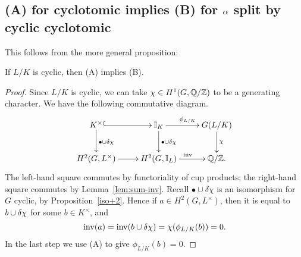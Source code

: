 \subsection{(A) for cyclotomic implies (B) for $\alpha$ split by cyclic cyclotomic}
This follows from the more general proposition:
\begin{pr}
If $L/K$ is cyclic, then (A) implies (B).
\end{pr}
\begin{proof}
Since $L/K$ is cyclic, we can take $\chi\in H^1(G,\mathbb{Q}/\mathbb{Z})$ to be a generating character. 
We have the following commutative diagram.
\[
\xymatrix{
K^{\times} \ar@{^(->}[r] \ar[d]^{\bullet\cup \de \chi} & \I_K \ar[r]^{\phi_{L/K}}\ar[d]^{\bullet\cup \de\chi} & G(L/K)\ar[d]^{\chi}\\
H^2(G,L^{\times}) \ar[r] & H^2(G,\I_L)\ar[r]^{\inv} & \Q/\Z.
}
\]
The left-hand square commutes by functoriality of cup products; the right-hand square commutes by Lemma~\ref{lem:sum-inv}. 
Recall $\bullet\cup \delta \chi$ is an isomorphism for $G$ cyclic, by Proposition~\ref{iso+2}. 
Hence if $a\in H^2(G,L^{\times})$, then it is equal to $b\cup \delta\chi$ for some $b\in K^{\times}$, and
\[
\operatorname{inv}(a)=\operatorname{inv}(b\cup \delta \chi)=\chi(\phi_{L/K}(b))=0.
\]
In the last step we use (A) to give $\phi_{L/K}(b)=0$.
\end{proof}
